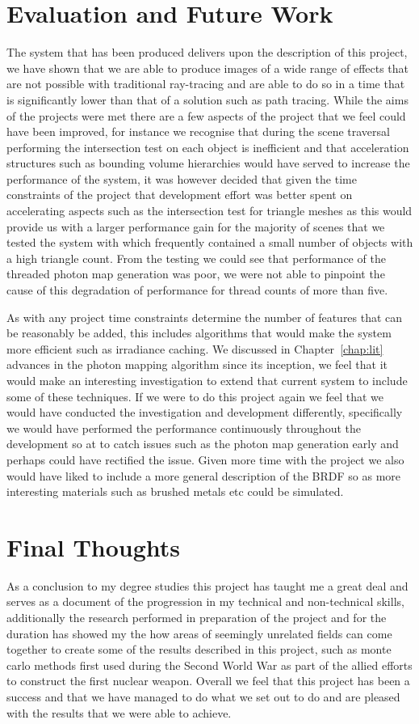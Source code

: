 \section{Evaluation and Future Work}
The system that has been produced delivers upon the description of this project, we have shown that we are able to produce images
of a wide range of effects that are not possible with traditional ray-tracing and are able to do so in a time that is significantly
lower than that of a solution such as path tracing. While the aims of the projects were met there are a few aspects of the project
that we feel could have been improved, for instance we recognise that during the scene traversal performing the
intersection test on each object is inefficient and that acceleration structures such as bounding volume hierarchies would
have served to increase the performance of the system, it was however decided that given the time constraints of the project
that development effort was better spent on accelerating aspects such as the intersection test for triangle meshes as this
would provide us with a larger performance gain for the majority of scenes that we tested the system with which frequently contained
a small number of objects with a high triangle count. From the testing we could see that performance of the threaded photon map
generation was poor, we were not able to pinpoint the cause of this degradation of performance for thread counts of more than five.

As with any project time constraints determine the number of features that can be reasonably be added, this includes algorithms that
would make the system more efficient such as irradiance caching. We discussed in Chapter~\ref{chap:lit} advances in the photon mapping
algorithm since its inception, we feel that it would make an interesting investigation to extend that current system to include
some of these techniques. If we were to do this project again we feel that we would have conducted the investigation and development
differently, specifically we would have performed the performance continuously throughout the development so at to catch issues such
as the photon map generation early and perhaps could have rectified the issue. Given more time with the project we also would have
liked to include a more general description of the BRDF so as more interesting materials such as brushed metals etc could be
simulated.

\section{Final Thoughts}
As a conclusion to my degree studies this project has taught me a great deal and serves as a document of the progression in my technical and
non-technical skills, additionally the research performed in preparation of the project and for the duration has showed my the
how areas of seemingly unrelated fields can come together to create some of the results described in this project, such as monte carlo methods
first used during the Second World War as part of the allied efforts to construct the first nuclear weapon. Overall we feel that this
project has been a success and that we have managed to do what we set out to do and are pleased with the results that we were able to
achieve.
